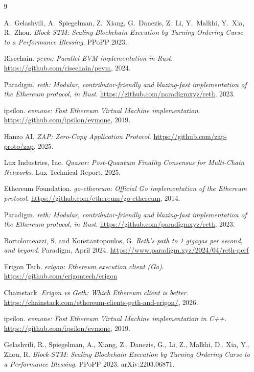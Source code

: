 \begin{thebibliography}{9}

A.~Gelashvili, A.~Spiegelman, Z.~Xiang, G.~Danezis, Z.~Li, Y.~Malkhi, Y.~Xia, R.~Zhou.
\emph{Block-STM: Scaling Blockchain Execution by Turning Ordering Curse to a Performance Blessing}.
PPoPP 2023.

Risechain.
\emph{pevm: Parallel EVM implementation in Rust}.
\url{https://github.com/risechain/pevm}, 2024.

Paradigm.
\emph{reth: Modular, contributor-friendly and blazing-fast implementation of the Ethereum protocol, in Rust}.
\url{https://github.com/paradigmxyz/reth}, 2023.

ipsilon.
\emph{evmone: Fast Ethereum Virtual Machine implementation}.
\url{https://github.com/ipsilon/evmone}, 2019.

Hanzo AI.
\emph{ZAP: Zero-Copy Application Protocol}.
\url{https://github.com/zap-proto/zap}, 2025.

Lux Industries, Inc.
\emph{Quasar: Post-Quantum Finality Consensus for Multi-Chain Networks}.
Lux Technical Report, 2025.


Ethereum Foundation.
\emph{go-ethereum: Official Go implementation of the Ethereum protocol}.
\url{https://github.com/ethereum/go-ethereum}, 2014.

Paradigm.
\emph{reth: Modular, contributor-friendly and blazing-fast implementation of the Ethereum protocol, in Rust}.
\url{https://github.com/paradigmxyz/reth}, 2023.

Bortolomeazzi, S. and Konstantopoulos, G.
\emph{Reth's path to 1 gigagas per second, and beyond}.
Paradigm, April 2024.
\url{https://www.paradigm.xyz/2024/04/reth-perf}

Erigon Tech.
\emph{erigon: Ethereum execution client (Go)}.
\url{https://github.com/erigontech/erigon}

Chainstack.
\emph{Erigon vs Geth: Which Ethereum client is better}.
\url{https://chainstack.com/ethereum-clients-geth-and-erigon/}, 2026.

ipsilon.
\emph{evmone: Fast Ethereum Virtual Machine implementation in C++}.
\url{https://github.com/ipsilon/evmone}, 2019.

Gelashvili, R., Spiegelman, A., Xiang, Z., Danezis, G., Li, Z., Malkhi, D., Xia, Y., Zhou, R.
\emph{Block-STM: Scaling Blockchain Execution by Turning Ordering Curse to a Performance Blessing}.
PPoPP 2023.
arXiv:2203.06871.


\end{thebibliography}
